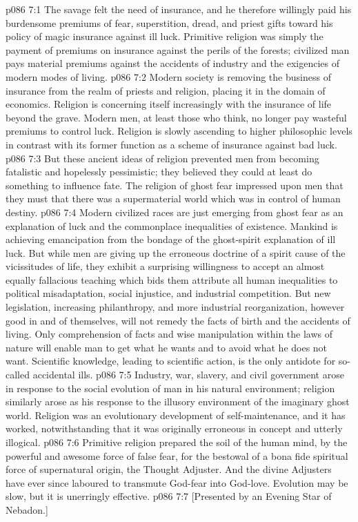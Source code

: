 \vs p086 7:1 The savage felt the need of insurance, and he therefore willingly paid his burdensome premiums of fear, superstition, dread, and priest gifts toward his policy of magic insurance against ill luck. Primitive religion was simply the payment of premiums on insurance against the perils of the forests; civilized man pays material premiums against the accidents of industry and the exigencies of modern modes of living.
\vs p086 7:2 Modern society is removing the business of insurance from the realm of priests and religion, placing it in the domain of economics. Religion is concerning itself increasingly with the insurance of life beyond the grave. Modern men, at least those who think, no longer pay wasteful premiums to control luck. Religion is slowly ascending to higher philosophic levels in contrast with its former function as a scheme of insurance against bad luck.
\vs p086 7:3 But these ancient ideas of religion prevented men from becoming fatalistic and hopelessly pessimistic; they believed they could at least do something to influence fate. The religion of ghost fear impressed upon men that they must  that there was a supermaterial world which was in control of human destiny.
\vs p086 7:4 Modern civilized races are just emerging from ghost fear as an explanation of luck and the commonplace inequalities of existence. Mankind is achieving emancipation from the bondage of the ghost\hyp{}spirit explanation of ill luck. But while men are giving up the erroneous doctrine of a spirit cause of the vicissitudes of life, they exhibit a surprising willingness to accept an almost equally fallacious teaching which bids them attribute all human inequalities to political misadaptation, social injustice, and industrial competition. But new legislation, increasing philanthropy, and more industrial reorganization, however good in and of themselves, will not remedy the facts of birth and the accidents of living. Only comprehension of facts and wise manipulation within the laws of nature will enable man to get what he wants and to avoid what he does not want. Scientific knowledge, leading to scientific action, is the only antidote for so\hyp{}called accidental ills.
\vs p086 7:5 \pc Industry, war, slavery, and civil government arose in response to the social evolution of man in his natural environment; religion similarly arose as his response to the illusory environment of the imaginary ghost world. Religion was an evolutionary development of self\hyp{}maintenance, and it has worked, notwithstanding that it was originally erroneous in concept and utterly illogical.
\vs p086 7:6 Primitive religion prepared the soil of the human mind, by the powerful and awesome force of false fear, for the bestowal of a bona fide spiritual force of supernatural origin, the Thought Adjuster. And the divine Adjusters have ever since laboured to transmute God\hyp{}fear into God\hyp{}love. Evolution may be slow, but it is unerringly effective.
\vsetoff
\vs p086 7:7 [Presented by an Evening Star of Nebadon.]
\quizlink
